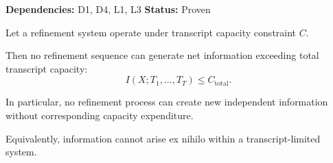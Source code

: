 \begin{theorem}
\textbf{Dependencies: } D1, D4, L1, L3
\textbf{Status: } Proven

Let a refinement system operate under transcript capacity constraint $C$.

Then no refinement sequence can generate net information exceeding total transcript capacity:
\[
I(X; T_1,\dots,T_T) \le C_{\text{total}}.
\]

In particular, no refinement process can create new independent information without corresponding capacity expenditure.

Equivalently, information cannot arise ex nihilo within a transcript-limited system.
\end{theorem}
